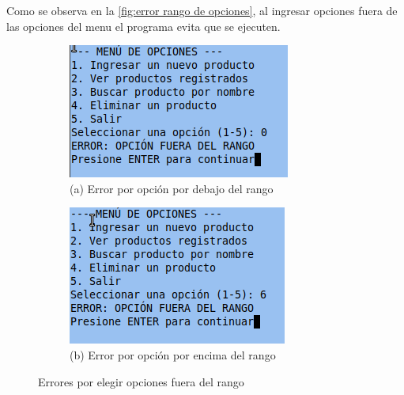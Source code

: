 \documentclass[12pt]{article}
\begin{document}
Como se observa en la \autoref{fig:error rango de opciones}, al ingresar opciones fuera de las opciones del menu 
el programa evita que se ejecuten.
\begin{figure}[H]
    \centering

    \begin{subfigure}[b]{0.4\textwidth}
        \centering
        \includegraphics[width=\textwidth]{Imagenes/img7.png}
        \caption*{(a) Error por opción por debajo del rango}
    \end{subfigure}
    \hfill
    \begin{subfigure}[b]{0.4\textwidth}
        \centering
        \includegraphics[width=\textwidth]{Imagenes/img8.png}
        \caption*{(b) Error por opción por encima del rango}
    \end{subfigure}

    \caption{Errores por elegir opciones fuera del rango}
    \label{fig:error rango de opciones}
\end{figure}
\end{document}
